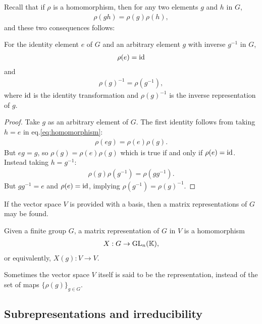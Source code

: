 	Recall that if $\rho$ is a homomorphism, then for any two elements $g$ and $h$ in $G$,
	\begin{align}\label{eq:homomorphism}
		\rho(gh) = \rho(g)\rho(h),
	\end{align}
	and these two consequences follows:	
	\begin{proposition}
		For the identity element $e$ of $G$ and an arbitrary element $g$ with inverse $g^{-1}$ in $G$,
		\begin{align}
			\rho(e) = \text{id}
		\end{align}
		and
		\begin{align}
			\rho(g)^{-1} = \rho(g^{-1}),
		\end{align}
		where $\text{id}$ is the identity transformation and $\rho(g)^{-1}$ is the inverse representation of $g$.
	\end{proposition}
	\begin{proof}
		Take $g$ as an arbitrary element of $G$. The first identity follows from taking $h=e$ in eq.\ref{eq:homomorphism}:
		\begin{align}
			\rho(eg) = \rho(e)\rho(g). %
		\end{align}
		But $eg=g$, so $\rho(g) = \rho(e)\rho(g)$ which is true if and only if $\rho(e) = \text{id}$. Instead taking $h=g^{-1}$:
		\begin{align}
			\rho(g) \rho(g^{-1}) =  \rho(gg^{-1}). %
		\end{align}
		But $gg^{-1} = e$ and $\rho(e) = \text{id}$, implying $\rho(g^{-1}) = \rho(g)^{-1}$.
	\end{proof}
	
	If the vector space $V$ is provided with a basis, then a matrix representations of $G$ may be found.
	\begin{definition}
		Given a finite group $G$, a matrix representation of $G$ in $V$ is a homomorphism
		\begin{align}
			X: G \rightarrow \text{GL}_n(\mathbb{K}),
		\end{align}
		or equivalently, $X(g): V \rightarrow V$.
	\end{definition}
	
	\begin{note}
		Sometimes the vector space $V$ itself is said to be the representation, instead of the set of maps $\{\rho(g)\}_{g \in G}$.
	\end{note}
	
	\subsection{Subrepresentations and irreducibility}
	
